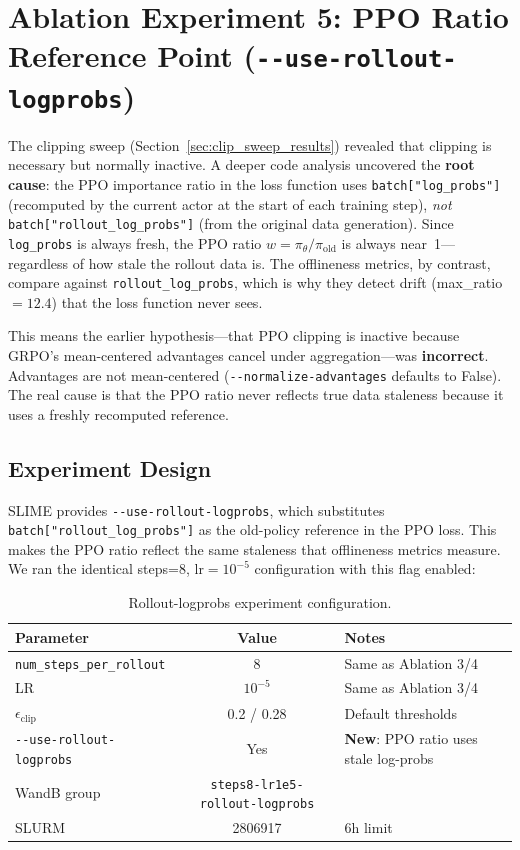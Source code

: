 \documentclass[11pt,a4paper]{article}
\begin{document}
\section{Ablation Experiment 5: PPO Ratio Reference Point (\texttt{-{}-use-rollout-logprobs})}
\label{sec:rollout_logprobs_results}

The clipping sweep (Section~\ref{sec:clip_sweep_results}) revealed that clipping is
necessary but normally inactive. A deeper code analysis uncovered the
\textbf{root cause}: the PPO importance ratio in the loss function uses
\texttt{batch["log\_probs"]} (recomputed by the current actor at the start of
each training step), \emph{not} \texttt{batch["rollout\_log\_probs"]} (from the
original data generation). Since \texttt{log\_probs} is always fresh, the PPO
ratio $w = \pi_\theta / \pi_{\mathrm{old}}$ is always near~1---regardless of
how stale the rollout data is. The offlineness metrics, by contrast, compare
against \texttt{rollout\_log\_probs}, which is why they detect drift
(max\_ratio $= 12.4$) that the loss function never sees.

This means the earlier hypothesis---that PPO clipping is inactive because
GRPO's mean-centered advantages cancel under aggregation---was \textbf{incorrect}.
Advantages are not mean-centered (\texttt{-{}-normalize-advantages} defaults to
False). The real cause is that the PPO ratio never reflects true data staleness
because it uses a freshly recomputed reference.

\subsection{Experiment Design}

SLIME provides \texttt{-{}-use-rollout-logprobs}, which substitutes
\texttt{batch["rollout\_log\_probs"]} as the old-policy reference in the PPO
loss. This makes the PPO ratio reflect the same staleness that offlineness
metrics measure. We ran the identical steps=8, $\mathrm{lr} = 10^{-5}$
configuration with this flag enabled:

\begin{table}[H]
\centering
\caption{Rollout-logprobs experiment configuration.}
\label{tab:rollout_lp_config}
\begin{tabular}{@{}lcl@{}}
\toprule
\textbf{Parameter} & \textbf{Value} & \textbf{Notes} \\
\midrule
\texttt{num\_steps\_per\_rollout} & 8 & Same as Ablation 3/4 \\
LR & $10^{-5}$ & Same as Ablation 3/4 \\
$\epsilon_{\mathrm{clip}}$ & 0.2 / 0.28 & Default thresholds \\
\texttt{-{}-use-rollout-logprobs} & Yes & \textbf{New}: PPO ratio uses stale log-probs \\
WandB group & \texttt{steps8-lr1e5-rollout-logprobs} & \\
SLURM & 2806917 & 6h limit \\
\bottomrule
\end{tabular}
\end{table}
\end{document}
